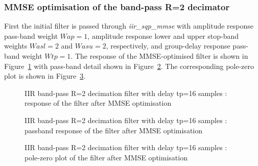\documentclass[a4paper,twoside,10pt,english]{report}
\begin{document}
\subsubsection{\label{sub:MMSE-optimisation-of-the-band-pass-R2-decimator}MMSE optimisation of the band-pass  R=2 decimator}
First the initial filter is passed through \emph{iir\_sqp\_mmse} with amplitude
response pass-band weight $Wap=1$, amplitude response lower and 
upper stop-band weights $Wasl=2$ and $Wasu=2$, respectively, and
group-delay response pass-band weight $Wtp=1$. The 
response of the MMSE-optimised filter is shown in 
Figure~\ref{fig:iir-sqp-slb-bandpass-test-mmse-x1} with pass-band detail
shown in Figure~\ref{fig:iir-sqp-slb-bandpass-test-mmse-x1-passband}. The 
corresponding pole-zero plot is shown in 
Figure~\ref{fig:iir-sqp-slb-bandpass-test-mmse-x1-pz}. 
\begin{figure}[!htbp]
\begin{center}
\scalebox{0.7}{}
\caption{IIR band-pass R=2 decimation filter with delay tp=16 samples : response of the filter after MMSE optimisation}
\label{fig:iir-sqp-slb-bandpass-test-mmse-x1}
\end{center}
\end{figure}
\begin{figure}[!htbp]
\begin{center}
\scalebox{0.7}{}
\caption{IIR band-pass R=2 decimation filter with delay tp=16 samples : passband response of the filter after MMSE optimisation}
\label{fig:iir-sqp-slb-bandpass-test-mmse-x1-passband}
\end{center}
\end{figure}
\begin{figure}[!htbp]
\begin{center}
\scalebox{0.7}{}
\caption{IIR band-pass R=2 decimation filter with delay tp=16 samples : pole-zero plot of the filter after MMSE optimisation}
\label{fig:iir-sqp-slb-bandpass-test-mmse-x1-pz}
\end{center}
\end{figure}
\clearpage
\end{document}
